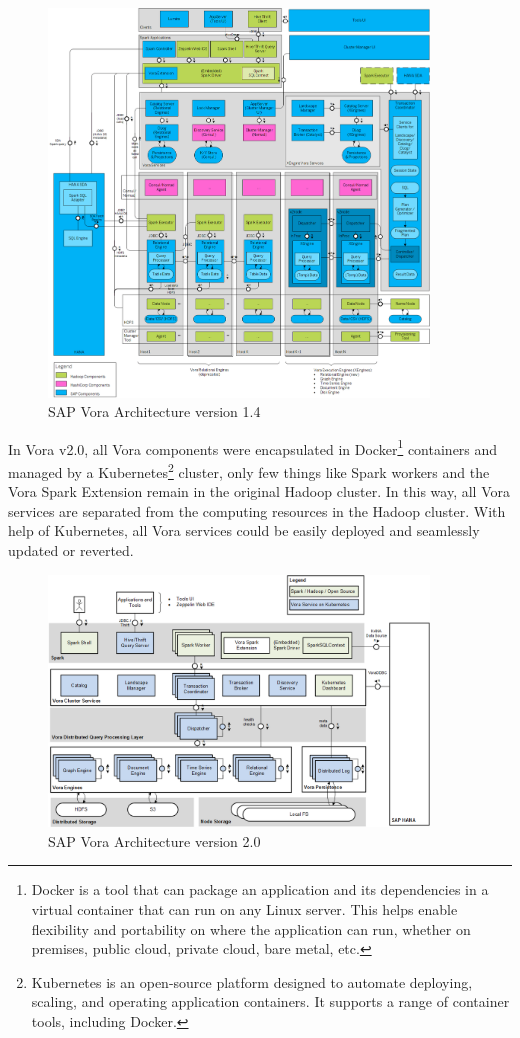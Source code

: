 \documentclass[article,colorback,accentcolor=tud4c]{tudreport}
\begin{document}
\begin{figure}[!h]
	\centering
	\includegraphics[width=0.9\textwidth]{vora14}
	\caption{SAP Vora Architecture version 1.4}
\end{figure}

In Vora v2.0, all Vora components were encapsulated in Docker\footnote{Docker is a tool that can package an application and its dependencies in a virtual container that can run on any Linux server. This helps enable flexibility and portability on where the application can run, whether on premises, public cloud, private cloud, bare metal, etc.} containers and managed by a Kubernetes\footnote{Kubernetes is an open-source platform designed to automate deploying, scaling, and operating application containers. It supports a range of container tools, including Docker.} cluster, only few things like Spark workers and the Vora Spark Extension remain in the original Hadoop cluster. In this way, all Vora services are separated from the computing resources in the Hadoop cluster. With help of Kubernetes, all Vora services could be easily deployed and seamlessly updated or reverted.

\begin{figure}[!h]
	\centering
	\includegraphics[width=0.9\textwidth]{vora20}
	\caption{SAP Vora Architecture version 2.0}
\end{figure}
\end{document}
